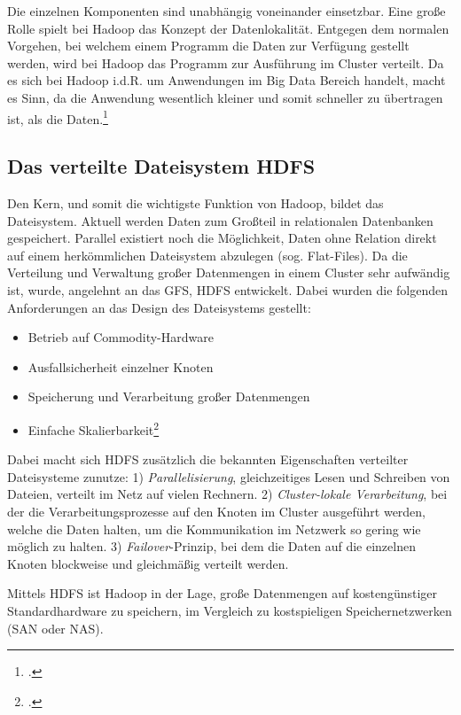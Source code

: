 Die einzelnen Komponenten sind unabhängig voneinander einsetzbar. Eine große Rolle spielt bei Hadoop das Konzept der Datenlokalität. Entgegen dem normalen Vorgehen, bei welchem einem Programm die Daten zur Verfügung gestellt werden, wird bei Hadoop das Programm zur Ausführung im Cluster verteilt. Da es sich bei Hadoop i.d.R. um Anwendungen im Big Data Bereich handelt, macht es Sinn, da die Anwendung wesentlich kleiner und somit schneller zu übertragen ist, als die Daten.\footcite[Vgl.][S. 20]{Freiknecht.2014}

\subsection{Das verteilte Dateisystem HDFS}\label{subsec:DasVerteilteDateisystemHDFS}
Den Kern, und somit die wichtigste Funktion von Hadoop, bildet das Dateisystem. Aktuell werden Daten zum Großteil in relationalen Datenbanken gespeichert. Parallel existiert noch die Möglichkeit, Daten ohne Relation direkt auf einem herkömmlichen Dateisystem abzulegen (sog. Flat-Files). Da die Verteilung und Verwaltung großer Datenmengen in einem Cluster sehr aufwändig ist, wurde, angelehnt an das \ac{GFS}, \ac{HDFS} entwickelt. Dabei wurden die folgenden Anforderungen an das Design des Dateisystems gestellt:

\begin{itemize}
	\item Betrieb auf \gls{Commodity-Hardware}
	\item Ausfallsicherheit einzelner Knoten
	\item Speicherung und Verarbeitung großer Datenmengen
	\item Einfache Skalierbarkeit\footcite[Vgl.][S. 21]{Freiknecht.2014}
\end{itemize}

Dabei macht sich \ac{HDFS} zusätzlich die bekannten Eigenschaften verteilter Dateisysteme zunutze: 1) \textit{Parallelisierung}, gleichzeitiges Lesen und Schreiben von Dateien, verteilt im Netz auf vielen Rechnern. 2) \textit{Cluster-lokale Verarbeitung}, bei der die Verarbeitungsprozesse auf den Knoten im Cluster ausgeführt werden, welche die Daten halten, um die Kommunikation im Netzwerk so gering wie möglich zu halten. 3) \textit{Failover}-Prinzip, bei dem die Daten auf die einzelnen Knoten blockweise und gleichmäßig verteilt werden.

Mittels \ac{HDFS} ist Hadoop in der Lage, große Datenmengen auf kostengünstiger Standardhardware zu speichern, im Vergleich zu kostspieligen Speichernetzwerken (\ac{SAN} oder \ac{NAS}). 

